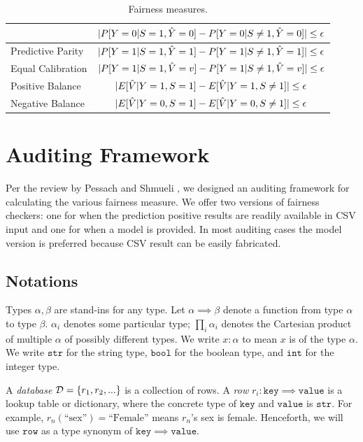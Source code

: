 \documentclass[conference]{IEEEtran}
\begin{document}
\begin{table}[h]
\begin{tabular}{|l|c|}
\cline{2-2}
                                 & $\lvert P[Y = 0 | S = 1, \hat{Y} = 0] - P[Y = 0 | S \neq 1, \hat{Y} = 0]\rvert \leq \epsilon$ \\
\hline
Predictive Parity & $\lvert P[Y = 1 | S = 1, \hat{Y} = 1] - P[Y = 1 | S \neq 1, \hat{Y} = 1]\rvert \leq \epsilon$ \\
\hline
Equal Calibration & $\lvert P[Y = 1 | S = 1, \hat{V} = v] - P[Y = 1 | S \neq 1, \hat{V} = v]\rvert \leq \epsilon$ \\
\hline
Positive Balance & $\lvert E[\hat{V} | Y = 1, S = 1] - E[\hat{V} | Y = 1, S \neq 1]\rvert \leq \epsilon$ \\
\hline
Negative Balance & $\lvert E[\hat{V} | Y = 0, S = 1] - E[\hat{V} | Y = 0, S \neq 1]\rvert \leq \epsilon$ \\
\hline
    \end{tabular}
    \caption{Fairness measures.}
    \label{tab:measures}
\end{table}

\section{Auditing Framework}
\label{sec:framework}
Per the review by Pessach and Shmueli \cite{pessach2022review}, we designed an auditing framework for calculating the various fairness measure. We offer two versions of fairness checkers: one for when the prediction positive results are readily available in CSV input and one for when a model is provided. In most auditing cases the model version is preferred because CSV result can be easily fabricated.

\subsection{Notations}
Types $\alpha,\beta$ are stand-ins for any type. Let $\alpha \implies \beta$ denote a function from type $\alpha$ to type $\beta$. $\alpha_i$ denotes some particular type; $\prod_i \alpha_i$ denotes the Cartesian product of multiple $\alpha$ of possibly different types. We write $x : \alpha$ to mean $x$ is of the type $\alpha$. We write $\mathtt{str}$ for the string type, $\mathtt{bool}$ for the boolean type, and $\mathtt{int}$ for the integer type.

A \emph{database} $\mathcal{D} = \{r_1, r_2, ...\}$ is a collection of rows. A \emph{row} $r_i : \mathtt{key} \implies \mathtt{value}$ is a lookup table or dictionary, where the concrete type of $\mathtt{key}$ and $\mathtt{value}$ is $\mathtt{str}$. For example, $r_n(\text{``sex''}) = \text{``Female''}$ means $r_n$'s sex is female. Henceforth, we will use $\mathtt{row}$ as a type synonym of $\mathtt{key} \implies \mathtt{value}$.
\end{document}

